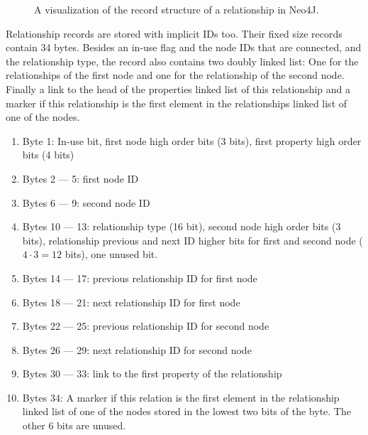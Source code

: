 \begin{figure}[htp]
\begin{center}
                    \end{center}
                    \caption{A visualization of the record structure of a relationship in Neo4J.} %
                \end{figure}
                
                Relationship records are stored with implicit IDs too. 
                Their fixed size records contain 34 bytes.
                Besides an in-use flag and the node IDs that are connected, and the relationship type, the record also contains two doubly linked list: One for the relationships of the first node and one for the relationship of the second node.
                Finally a link to the head of the properties linked list of this relationship and a marker if this relationship is the first element in the relationships linked list of one of the nodes.
                \newpage
                
                \begin{enumerate}
                    \item Byte 1: In-use bit, first node high order bits (3 bits), first property high order bits (4 bits)
                    \item Bytes 2 --- 5: first node ID 
                    \item Bytes 6 --- 9: second node ID 
                    \item Bytes 10 --- 13: relationship type (16 bit), second node high order bits (3 bits), relationship previous and next ID higher bits for first and second node ($4 \cdot 3 = 12$ bits), one unused bit.
                    \item Bytes 14 --- 17: previous relationship ID for first node
                    \item Bytes 18 --- 21: next relationship ID for first node
                    \item Bytes 22 --- 25: previous relationship ID for second node
                    \item Bytes 26 --- 29: next relationship ID for second node
                    \item Bytes 30 --- 33: link to the first property of the relationship
                    \item Bytes 34: A marker if this relation is the first element in the relationship linked list of one of the nodes stored in the lowest two bits of the byte. 
                        The other 6 bits are unused.
                \end{enumerate}


